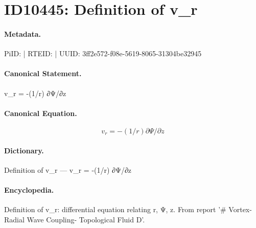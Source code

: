 \section*{ID10445: Definition of v\_r}
\paragraph{Metadata.}
PiID:  | RTEID:  | UUID: 3ff2e572-f08e-5619-8065-31304be32945

\paragraph{Canonical Statement.}
v\_r = -(1/r) ∂Ψ/∂z

\paragraph{Canonical Equation.}
\[
v_r = -(1/r) ∂Ψ/∂z
\]

\paragraph{Dictionary.}
Definition of v\_r — v\_r = -(1/r) ∂Ψ/∂z

\paragraph{Encyclopedia.}
Definition of v\_r: differential equation relating r, Ψ, z. From report '\# Vortex-Radial Wave Coupling- Topological Fluid D'.
